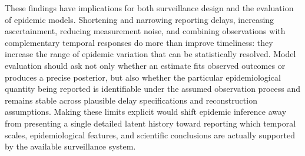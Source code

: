 These findings have implications for both surveillance design and the evaluation of epidemic models. Shortening and narrowing reporting delays, increasing ascertainment, reducing measurement noise, and combining observations with complementary temporal responses do more than improve timeliness: they increase the range of epidemic variation that can be statistically resolved. Model evaluation should ask not only whether an estimate fits observed outcomes or produces a precise posterior, but also whether the particular epidemiological quantity being reported is identifiable under the assumed observation process and remains stable across plausible delay specifications and reconstruction assumptions. Making these limits explicit would shift epidemic inference away from presenting a single detailed latent history toward reporting which temporal scales, epidemiological features, and scientific conclusions are actually supported by the available surveillance system.